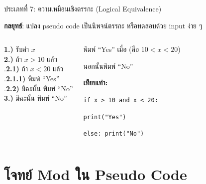 \documentclass[11pt, aspectratio=169]{beamer}
\begin{document}
\begin{frame}{ประเภทที่ 7: ความเหมือนเชิงตรรกะ (Logical Equivalence)}
  \begin{explanation}
    \textbf{กลยุทธ์}: แปลง pseudo code เป็นนิพจน์ตรรกะ หรือทดสอบด้วย input ง่าย ๆ
  \end{explanation}

  \begin{columns}[T]
      \begin{pseudobox}
        \textbf{1.)} รับค่า $x$ \\
        \textbf{2.)} ถ้า $x > 10$ แล้ว \\
        .\qquad \textbf{2.1)} ถ้า $x < 20$ แล้ว \\
        .\qquad\quad \textbf{2.1.1)} พิมพ์ ``Yes'' \\
        .\qquad \textbf{2.2)} มิฉะนั้น พิมพ์ ``No'' \\
        \textbf{3.)} มิฉะนั้น พิมพ์ ``No''
      \end{pseudobox}
      \begin{solbox}[สมมูลกับ]
        พิมพ์ ``Yes'' เมื่อ 
        (คือ $10 < x < 20$)

        นอกนั้นพิมพ์ ``No''

        \medskip
        \textbf{เทียบเท่า:}

        \texttt{if x > 10 and x < 20:}

        \qquad \texttt{print("Yes")}

        \texttt{else: print("No")}
      \end{solbox}
  \end{columns}
\end{frame}

\section{โจทย์ Mod ใน Pseudo Code}
\end{document}
